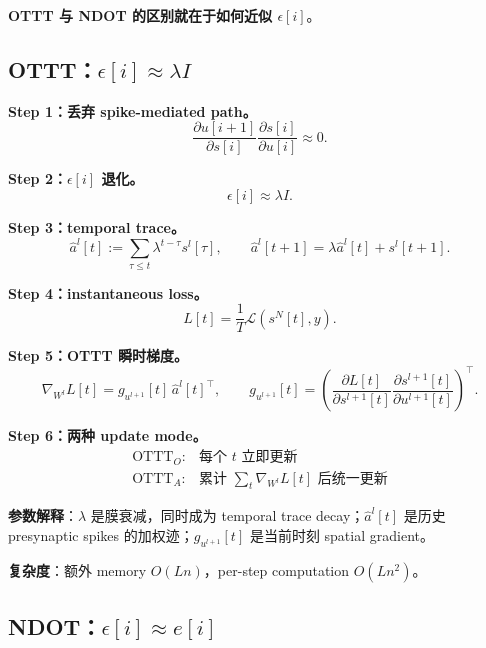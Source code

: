 \documentclass[journal,12pt,onecolumn]{IEEEtran}
\begin{document}
\textbf{OTTT 与 NDOT 的区别就在于如何近似 $\epsilon[i]$}。

\subsection{OTTT：$\epsilon[i]\approx\lambda I$}

\textbf{Step 1：丢弃 spike-mediated path。}
\begin{equation}
\frac{\partial u[i+1]}{\partial s[i]}\frac{\partial s[i]}{\partial u[i]}\approx 0.
\end{equation}

\textbf{Step 2：$\epsilon[i]$ 退化。}
\begin{equation}
\epsilon[i]\approx\lambda I.
\end{equation}

\textbf{Step 3：temporal trace。}
\begin{equation}
\hat a^l[t]:=\sum_{\tau\le t}\lambda^{t-\tau}s^l[\tau],
\qquad
\hat a^l[t+1]=\lambda\hat a^l[t]+s^l[t+1].
\end{equation}

\textbf{Step 4：instantaneous loss。}
\begin{equation}
L[t]=\frac{1}{T}\mathcal{L}(s^N[t],y).
\end{equation}

\textbf{Step 5：OTTT 瞬时梯度。}
\begin{equation}
\nabla_{W^l}L[t]=g_{u^{l+1}}[t]\,\hat a^l[t]^\top,
\qquad
g_{u^{l+1}}[t]=\left(\frac{\partial L[t]}{\partial s^{l+1}[t]}\frac{\partial s^{l+1}[t]}{\partial u^{l+1}[t]}\right)^\top.
\end{equation}

\textbf{Step 6：两种 update mode。}
\begin{equation}
\begin{array}{cl}
\text{OTTT}_O: & \text{每个 }t\text{ 立即更新}\\[1mm]
\text{OTTT}_A: & \text{累计 }\sum_t\nabla_{W^l}L[t]\text{ 后统一更新}
\end{array}
\end{equation}

\textbf{参数解释}：$\lambda$ 是膜衰减，同时成为 temporal trace decay；$\hat a^l[t]$ 是历史 presynaptic spikes 的加权迹；$g_{u^{l+1}}[t]$ 是当前时刻 spatial gradient。

\textbf{复杂度}：额外 memory $O(Ln)$，per-step computation $O(Ln^2)$。

\subsection{NDOT：$\epsilon[i]\approx e[i]$}
\end{document}

